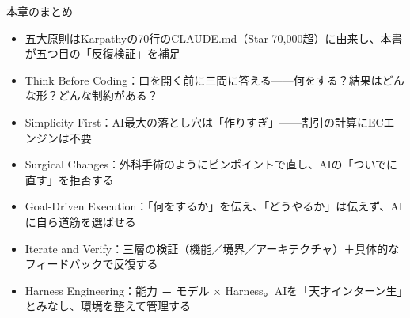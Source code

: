 \begin{tcbsummary}{本章のまとめ}
\begin{itemize}
  \item 五大原則はKarpathyの70行のCLAUDE.md（Star 70,000超）に由来し、本書が五つ目の「反復検証」を補足
  \item Think Before Coding：口を開く前に三問に答える——何をする？結果はどんな形？どんな制約がある？
  \item Simplicity First：AI最大の落とし穴は「作りすぎ」——割引の計算にECエンジンは不要
  \item Surgical Changes：外科手術のようにピンポイントで直し、AIの「ついでに直す」を拒否する
  \item Goal-Driven Execution：「何をするか」を伝え、「どうやるか」は伝えず、AIに自ら道筋を選ばせる
  \item Iterate and Verify：三層の検証（機能／境界／アーキテクチャ）＋具体的なフィードバックで反復する
  \item Harness Engineering：能力 ＝ モデル × Harness。AIを「天才インターン生」とみなし、環境を整えて管理する
\end{itemize}

\end{tcbsummary}
